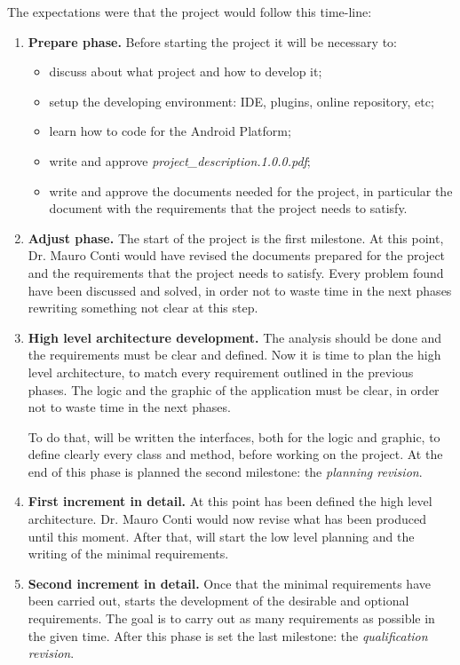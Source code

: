 The expectations were that the project would follow this time-line:
\begin{enumerate}
\item \textbf{Prepare phase.} Before starting the project it will be necessary to:
\begin{itemize}
\item discuss about what project and how to develop it;
\item setup the developing environment: IDE, plugins, online repository, etc;
\item learn how to code for the Android Platform;
\item write and approve \textit{project\_description.1.0.0.pdf};
\item write and approve the documents needed for the project, in particular the document with the requirements that the project needs to satisfy.
\end{itemize}

\item \textbf{Adjust phase.} The start of the project is the first milestone. At this point, Dr. Mauro Conti would have revised the documents prepared for the project and the requirements that the project needs to satisfy. Every problem found have been discussed and solved, in order not to waste time in the next phases rewriting something not clear at this step.

\item \textbf{High level architecture development.} The analysis should be done and the requirements must be clear and defined. Now it is time to plan the high level architecture, to match every requirement outlined in the previous phases. The logic and the graphic of the application must be clear, in order not to waste time in the next phases.

To do that, will be written the interfaces, both for the logic and graphic, to define clearly every class and method, before working on the project. At the end of this phase is planned the second milestone: the \textit{planning revision}.

\item \textbf{First increment in detail.} At this point has been defined the high level architecture. Dr. Mauro Conti would now revise what has been produced until this moment. After that, will start the low level planning and the writing of the minimal requirements.

\item \textbf{Second increment in detail.} Once that the minimal requirements have been  carried out, starts the development of the desirable and optional requirements. The goal is to carry out as many requirements as possible in the given time. After this phase is set the last milestone: the \textit{qualification revision}.


\end{enumerate}
